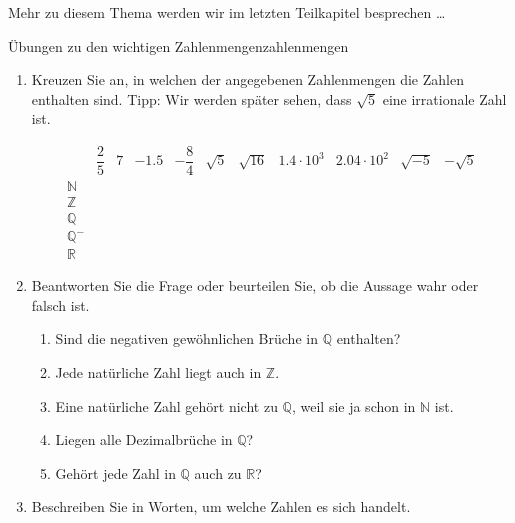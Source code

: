 Mehr zu diesem Thema werden wir im letzten Teilkapitel besprechen \dots

\clearpage

\begin{ueb}
    {Übungen zu den wichtigen Zahlenmengen}{zahlenmengen}

    \begin{enumerate}
        \item Kreuzen Sie an, in welchen der angegebenen Zahlenmengen die Zahlen enthalten sind. Tipp: Wir werden später sehen, dass \(\sqrt{5}\) eine irrationale Zahl ist.

              \[
                  \begin{array}{c|c|c|c|c|c|c|c|c|c|c}
                                   & \dfrac{2}{5}   & 7               & -1.5      & -\dfrac{8}{4} & \sqrt{5} & \sqrt{16}
                                   & 1.4 \cdot 10^3 & 2.04 \cdot 10^2 & \sqrt{-5} & -\sqrt{5}                                       \\ \hline
                      \mathbb{N}   &                &                 &           &               &          &           &  &  &  & \\ \hline
                      \mathbb{Z}   &                &                 &           &               &          &           &  &  &  & \\ \hline
                      \mathbb{Q}   &                &                 &           &               &          &           &  &  &  & \\ \hline
                      \mathbb{Q}^- &                &                 &           &               &          &           &  &  &  & \\ \hline
                      \mathbb{R}   &                &                 &           &               &          &           &  &  &  &
                  \end{array}
              \]

        \item
              Beantworten Sie die Frage oder beurteilen Sie, ob die Aussage wahr oder falsch ist.

              \begin{enumerate}
                  \item Sind die negativen gewöhnlichen Brüche in \(\mathbb{Q}\) enthalten?
                  \item Jede natürliche Zahl liegt auch in \(\mathbb{Z}\).
                  \item Eine natürliche Zahl gehört nicht zu \(\mathbb{Q}\), weil sie ja schon in \(\mathbb{N}\) ist.
                  \item Liegen alle Dezimalbrüche in \(\mathbb{Q}\)?
                  \item Gehört jede Zahl in \(\mathbb{Q}\) auch zu \(\mathbb{R}\)?
              \end{enumerate}
        \item Beschreiben Sie in Worten, um welche Zahlen es sich handelt.


\end{enumerate}
\end{ueb}
